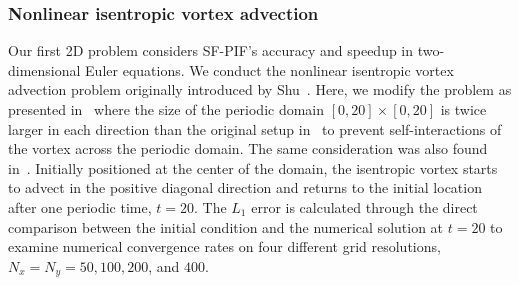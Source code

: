 \documentclass[times,preprint,3p]{elsarticle}
\begin{document}
\subsubsection{Nonlinear isentropic vortex advection}\label{sec:vortex}
Our first 2D problem considers SF-PIF's accuracy and speedup
in two-dimensional Euler equations.
We conduct the nonlinear isentropic vortex advection problem
originally introduced by Shu~\cite{shu1998essentially}.
%
Here, we modify the problem as presented in~\cite{spiegel2015survey}
where the size of the periodic domain $[0, 20] \times [0, 20]$ is twice larger in each direction
than the original setup in~\cite{shu1998essentially}
to prevent self-interactions of the vortex across the periodic domain.
The same consideration was also found in~\cite{lee2017piecewise,reyes2019variable}.
%
Initially positioned at the center of the domain,
the isentropic vortex starts to advect in the positive diagonal direction
and returns to the initial location after one periodic time, $t=20$.
The \( L_{1} \) error is calculated through the direct
comparison between the initial condition
and the numerical solution at $t=20$ to examine numerical convergence rates
on four different grid resolutions, $N_x=N_y=50, 100, 200$, and $400$.
\end{document}
